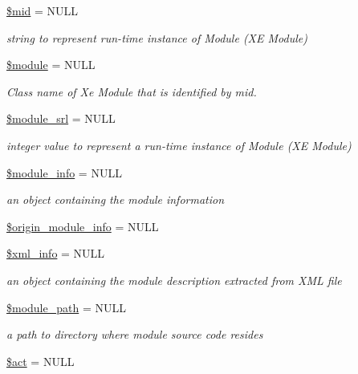 \begin{DoxyCompactItemize}
\item 
\hyperlink{classModuleObject_abb68807f12d0fde6c9ea78a1a820d250}{\$mid} = N\+U\+L\+L
\begin{DoxyCompactList}\small\item\em string to represent run-\/time instance of Module (X\+E Module) \end{DoxyCompactList}\item 
\hyperlink{classModuleObject_a2809af79b38269089ba46bc922061ae8}{\$module} = N\+U\+L\+L
\begin{DoxyCompactList}\small\item\em Class name of Xe Module that is identified by mid. \end{DoxyCompactList}\item 
\hyperlink{classModuleObject_a0da50016ddc31513f563206fdf6f413d}{\$module\+\_\+srl} = N\+U\+L\+L
\begin{DoxyCompactList}\small\item\em integer value to represent a run-\/time instance of Module (X\+E Module) \end{DoxyCompactList}\item 
\hyperlink{classModuleObject_ac1c9807e77270f2e2abe4f79e1cd2987}{\$module\+\_\+info} = N\+U\+L\+L
\begin{DoxyCompactList}\small\item\em an object containing the module information \end{DoxyCompactList}\item 
\hyperlink{classModuleObject_a6bdf7982a5defc9d618c2dd1b700e876}{\$origin\+\_\+module\+\_\+info} = N\+U\+L\+L
\item 
\hyperlink{classModuleObject_aa0003698bcfe16bb25031435df251715}{\$xml\+\_\+info} = N\+U\+L\+L
\begin{DoxyCompactList}\small\item\em an object containing the module description extracted from X\+M\+L file \end{DoxyCompactList}\item 
\hyperlink{classModuleObject_aba24677d5cf457dc33d9af3d8a3b3a14}{\$module\+\_\+path} = N\+U\+L\+L
\begin{DoxyCompactList}\small\item\em a path to directory where module source code resides \end{DoxyCompactList}\item 
\hyperlink{classModuleObject_a9d43905d072c53cd5cd239d706215895}{\$act} = N\+U\+L\+L

\end{DoxyCompactItemize}
